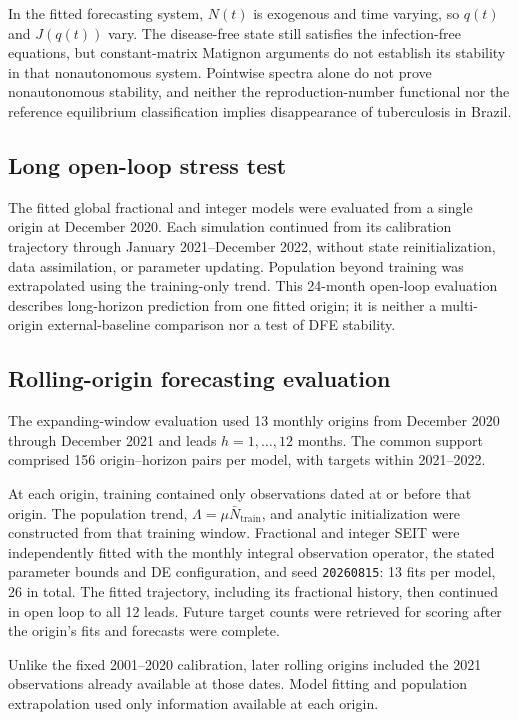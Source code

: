 \documentclass[pdflatex,sn-mathphys-ay,lineno]{sn-jnl}
\begin{document}
In the fitted forecasting system, $N(t)$ is exogenous and time varying, so $q(t)$ and $J(q(t))$ vary. The disease-free state still satisfies the infection-free equations, but constant-matrix Matignon arguments do not establish its stability in that nonautonomous system. Pointwise spectra alone do not prove nonautonomous stability, and neither the reproduction-number functional nor the reference equilibrium classification implies disappearance of tuberculosis in Brazil.

\subsection{Long open-loop stress test}

The fitted global fractional and integer models were evaluated from a single origin at December 2020. Each simulation continued from its calibration trajectory through January 2021--December 2022, without state reinitialization, data assimilation, or parameter updating. Population beyond training was extrapolated using the training-only trend. This 24-month open-loop evaluation describes long-horizon prediction from one fitted origin; it is neither a multi-origin external-baseline comparison nor a test of DFE stability.

\subsection{Rolling-origin forecasting evaluation}

The expanding-window evaluation used 13 monthly origins from December 2020 through December 2021 and leads $h=1,\ldots,12$ months. The common support comprised 156 origin--horizon pairs per model, with targets within 2021--2022.

At each origin, training contained only observations dated at or before that origin. The population trend, $\Lambda=\mu\bar N_{\mathrm{train}}$, and analytic initialization were constructed from that training window. Fractional and integer SEIT were independently fitted with the monthly integral observation operator, the stated parameter bounds and DE configuration, and seed \texttt{20260815}: 13 fits per model, 26 in total. The fitted trajectory, including its fractional history, then continued in open loop to all 12 leads. Future target counts were retrieved for scoring after the origin's fits and forecasts were complete.

Unlike the fixed 2001--2020 calibration, later rolling origins included the 2021 observations already available at those dates. Model fitting and population extrapolation used only information available at each origin.
\end{document}
